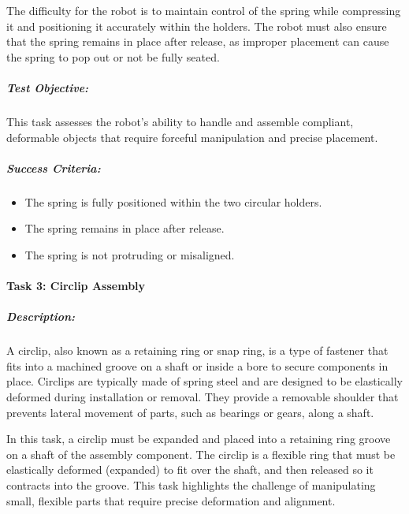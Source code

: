 \documentclass[letterpaper,10pt,english]{sphinxmanual}
\let\sphinxpxdimen\pdfpxdimen\else\newdimen\sphinxpxdimen
\begin{document}
\sphinxAtStartPar
The difficulty for the robot is to maintain control of the spring while compressing it and positioning it accurately within the holders.
The robot must also ensure that the spring remains in place after release, as improper placement can cause the spring to pop out or not be fully seated.

\noindent{\hspace*{\fill}\sphinxincludegraphics[width=400\sphinxpxdimen]{{spring_placement_finished}.png}\hspace*{\fill}}


\subparagraph{Test Objective:}
\label{\detokenize{robotic_instructions_elastic_deformation:id2}}
\sphinxAtStartPar
This task assesses the robot’s ability to handle and assemble compliant, deformable objects that require forceful manipulation and precise placement.


\subparagraph{Success Criteria:}
\label{\detokenize{robotic_instructions_elastic_deformation:id3}}\begin{itemize}
\item {} 
\sphinxAtStartPar
The spring is fully positioned within the two circular holders.

\item {} 
\sphinxAtStartPar
The spring remains in place after release.

\item {} 
\sphinxAtStartPar
The spring is not protruding or misaligned.

\end{itemize}


\paragraph{Task 3: Circlip Assembly}
\label{\detokenize{robotic_instructions_elastic_deformation:task-3-circlip-assembly}}

\subparagraph{Description:}
\label{\detokenize{robotic_instructions_elastic_deformation:id4}}
\sphinxAtStartPar
A circlip, also known as a retaining ring or snap ring, is a type of fastener that fits into a machined groove on a shaft or inside a bore to secure components in place.
Circlips are typically made of spring steel and are designed to be elastically deformed during installation or removal.
They provide a removable shoulder that prevents lateral movement of parts, such as bearings or gears, along a shaft.

\sphinxAtStartPar
In this task, a circlip must be expanded and placed into a retaining ring groove on a shaft of the assembly component.
The circlip is a flexible ring that must be elastically deformed (expanded) to fit over the shaft, and then released so it contracts into the groove.
This task highlights the challenge of manipulating small, flexible parts that require precise deformation and alignment.
\end{document}

